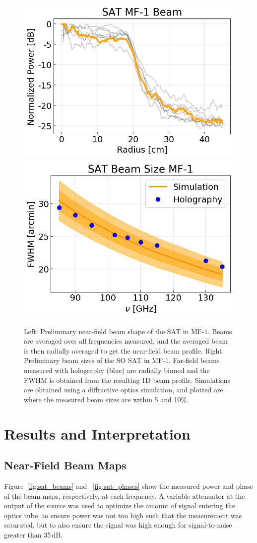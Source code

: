  \begin{figure}
    \centering
    \includegraphics[width = .47\textwidth]{Figures/sat_radbin.png}
    \includegraphics[width = .47\textwidth]{Figures/sat_fwhm.png}
    \caption{Left: Preliminary near-field beam shape of the SAT in MF-1.  Beams are averaged over all frequencies measured, and the averaged beam is then radially averaged to get the near-field beam profile.  Right: Preliminary beam sizes of the SO SAT in MF-1.  Far-field beams measured with holography (blue) are radially binned and the FWHM is obtained from the resulting 1D beam profile.  Simulations are obtained using a diffractive optics simulation, and plotted are where the measured beam sizes are within 5 and 10\%.}
    \label{fig:sat_fwhm}
\end{figure}

\section{Results and Interpretation}
\label{sec:sat_results}

\subsection{Near-Field Beam Maps}
Figure~\ref{fig:sat_beams} and ~\ref{fig:sat_phases} show the measured power and phase of the beam maps, respectively, at each frequency.   A variable attenuator at the output of the source was used to optimize the amount of signal entering the optics tube, to ensure power was not too high such that the measurement was saturated, but to also ensure the signal was high enough for signal-to-noise greater than 35\,dB.

